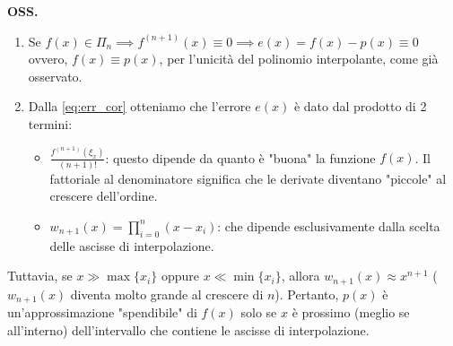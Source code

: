 \newpage
\textbf{OSS.}
\begin{enumerate}
    \item Se $f(x) \in \Pi_n \implies f^{(n+1)}(x) \equiv 0 \implies e(x) = f(x) - p(x) \equiv 0$ ovvero, $f(x) \equiv p(x)$, per l'unicità del polinomio interpolante, come già osservato.
    \item Dalla \eqref{eq:err_cor} otteniamo che l'errore $e(x)$ è dato dal prodotto di 2 termini:
    \begin{itemize}
        \item $\frac{f^{(n+1)}(\xi_x)}{(n+1)!}$: questo dipende da quanto è "buona" la funzione $f(x)$. Il fattoriale al denominatore significa che le derivate diventano "piccole" al crescere dell'ordine.
        \item $w_{n+1}(x) = \prod_{i=0}^{n} (x - x_i)$: che dipende esclusivamente dalla scelta delle ascisse di interpolazione.
    \end{itemize}
\end{enumerate}

Tuttavia, se $x \gg \max \{x_i\}$ oppure $x \ll \min \{x_i\}$, allora $w_{n+1}(x) \approx x^{n+1}$ ($w_{n+1}(x)$ diventa molto grande al crescere di $n$). Pertanto, $p(x)$ è un'approssimazione "spendibile" di $f(x)$ solo se $x$ è prossimo (meglio se all'interno) dell'intervallo che contiene le ascisse di interpolazione.

\begin{center}
    \end{center}

